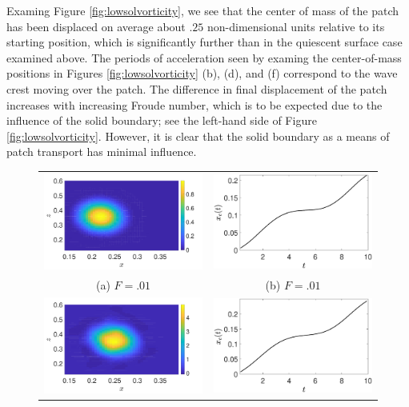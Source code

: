 \documentclass[a4paper,11pt]{article}
\begin{document}
Examing Figure \ref{fig:lowsolvorticity}, we see that the center of mass of the patch has been displaced on average about $.25$ non-dimensional units relative to its starting position, which is significantly further than in the quiescent surface case examined above.  The periods of acceleration seen by examing the center-of-mass positions in Figures \ref{fig:lowsolvorticity} (b), (d), and (f) correspond to the wave crest moving over the patch.  The difference in final displacement of the patch increases with increasing Froude number, which is to be expected due to the influence of the solid boundary; see the left-hand side of Figure \ref{fig:lowsolvorticity}.  However, it is clear that the solid boundary as a means of patch transport has minimal influence.
\begin{figure}
\centering
\begin{tabular}{cc}
\includegraphics[width=.45\textwidth]{vorticity_wm_1_modu_pt3} &  \includegraphics[width=.45\textwidth]{com_wm_1_modu_pt3}\\
(a) $F=.01$ & (b) $F=.01$\\
\includegraphics[width=.45\textwidth]{vorticity_wm_5_modu_pt3} & \includegraphics[width=.45\textwidth]{com_wm_5_modu_pt3}\\

\end{tabular}
\end{figure}
\end{document}
